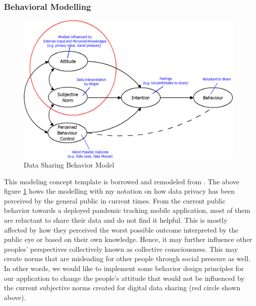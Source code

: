     \subsubsection{Behavioral Modelling}
      \begin{figure}[H]
        \centering
        \includegraphics[scale=1]{img/digital-prototype/behavior-model.png}
        \caption{Data Sharing Behavior Model}
        \label{fig:behavior-model}
      \end{figure}
      \par This modeling concept template is borrowed and remodeled from \parencite{Ian8}. The above figure \ref{fig:behavior-model} hows the
      modelling with my notation on how data privacy has been perceived by the general public in current
      times. From the current public behavior towards a deployed pandemic tracking mobile application,
      most of them are reluctant to share their data and do not find it helpful. This is mostly affected by
      how they perceived the worst possible outcome interpreted by the public eye or based on their own
      knowledge. Hence, it may further influence other peoples' perspectives collectively known as
      collective consciousness. This may create norms that are misleading for other people through social
      pressure as well. In other words, we would like to implement some behavior design principles for
      our application to change the people's attitude that would not be influenced by the current subjective
      norms created for digital data sharing (red circle shown above).
    
